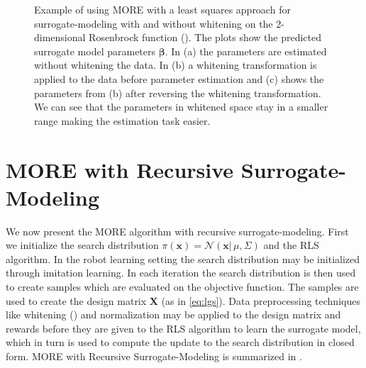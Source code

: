 \begin{figure}[t]
  \centering
  \caption{\small
    Example of using MORE with a least squares approach for
    surrogate-modeling with and without whitening on the 2-dimensional
    Rosenbrock function ().
    The plots show the predicted surrogate model
    parameters $\mathbf{\beta}$. In (a) the parameters are estimated
    without whitening the data. In (b) a whitening transformation is
    applied to the data before parameter estimation
    and (c) shows the parameters from (b) after reversing
    the whitening transformation.
    We can see that the parameters in whitened space
    stay in a smaller range 
    making the estimation task easier.}
 \label{fig:whitening}
\end{figure}


\section{MORE with Recursive Surrogate-Modeling}
We now present the MORE algorithm with recursive surrogate-modeling.
First we initialize the search distribution 
$\pi(\mathbf{x}) = \mathcal{N}(\mathbf{x} |\, \mu, \Sigma)$ and
the RLS algorithm. In the robot
learning setting the search distribution may be initialized
through imitation learning.
In each iteration the search distribution is then used to create
samples which are evaluated on the objective function.
The samples are used to create the design matrix $\mathbf{X}$
(as in \ref{eq:lgs}).
Data preprocessing techniques like whitening ()
and normalization
may be applied to the design matrix and rewards before they
are given to the RLS algorithm to learn the surrogate model, which in turn
is used to compute the update to the search distribution in closed form.
MORE with Recursive Surrogate-Modeling is summarized in .

